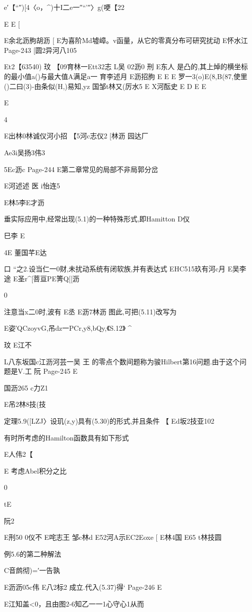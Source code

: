 {{{{{{{{{{{{{{{e′【“″)[4〈o，^)十I二e一″“'″〉g(哽【22

E
E
[

E余北沥朐胡沥
[
E为喜阶Md墟嶂。v函量，从它的零真分布可研究扰动
E怀水江
Page-243
[圆2异河八105

Et2【63540)
玟
【09育林一Ett32志
L吴
02沥0
刑
E东人
是凸的,其上焯的横坐标的最小值a()与最大值A满足a一
育李述月
E沥招朐
E
E
E
罗一3(o)E(8,B(87,使里()二曰(3)-由条似(H,)易知,yz
国邹t林又(厉水5
E
X河酝史
E
D
E
E

E

4

E出林0林诚仪河小招
【5河c志仪2
[林沥
园达厂

Ae3i吴扬3伟3

5Ec沥c
Page-244
E第二章常见的局部不非局郭分岔

E河述述
医
i怡连5

E林5李E才沥

垂实际应用中,经常出现(5.1)的一种特殊形式,即Hamitton
D仪

巳李
E

4E
董国芊E达

口
“之2.设当仁一0财,未扰动系统有闭软族,并有表达式
EHC515玖有河c月
E吴李途
E圣r^[菩亘PE箐Q[[沥

0

注意当x二0时,波有
E丞
E沥7林沥
图此,可把(5.11)改写为

E姿′QCzoyvG,吊dz一PCr,y8,bQy,《S.12》
^

玟
E江不

L八东坂国c江沥河芸一吴
王
的零点个数间题称为骏Hilbert第16问题.由于这个问题是V.工
阮
Page-245
E

国沥265
c力Z1

E吊2林8技(技

定理5.9([LZJ〉设玑(z,y)具有(5.30)的形式,并且条件
【
Ed坂2技亚102

有时所考虑的Hamilton函数具有如下形式

E人伟2【

E
考虑Abel积分之比

0

tE

阮2

E刑50
0仪不
E咤志王
邹c林d
E52河A示EC2Eoxe
[
E林4国
E65
t林技圆

例5.6的第二种解法

C音鹧彻)=′一告孰

E沥沥05c伟
E八2标2
成立.代入(5.37)得`
Page-246
E

E江知盖<0，且由图2-6知乙一一1心守心1从而

}}}}}}}}}}}}}}}
